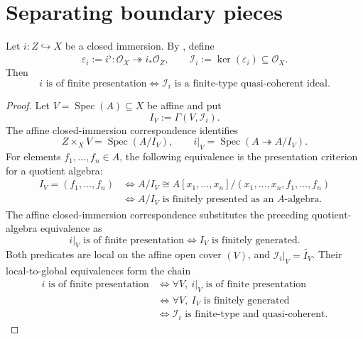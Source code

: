 \section{Separating boundary pieces}

\begin{lemma}
  \label{lemma:nagata-closed-fp-ideal-finite-type}

  Let $i\colon Z\hookrightarrow X$ be a closed immersion.  By
  , define
  \[
    \varepsilon_i:=i^\flat\colon
      \mathcal O_X\twoheadrightarrow i_*\mathcal O_Z,
    \qquad
    \mathcal I_i:=\ker(\varepsilon_i)
      \subseteq\mathcal O_X.
  \]
  Then
  \[
    i\text{ is of finite presentation}
      \Longleftrightarrow
    \mathcal I_i\text{ is a finite-type quasi-coherent ideal}.
  \]
\end{lemma}

\begin{proof}
  Let $V=\operatorname{Spec}(A)\subseteq X$ be affine and put
  \[
    I_V:=\Gamma(V,\mathcal I_i).
  \]
  The affine closed-immersion correspondence identifies
  \[
    Z\times_XV=\operatorname{Spec}(A/I_V),
    \qquad
    i|_V=\operatorname{Spec}(A\twoheadrightarrow A/I_V).
  \]
  For elements $f_1,\ldots,f_n\in A$, the following equivalence is the
  presentation criterion for a quotient algebra:
  \[
  \begin{aligned}
    I_V=(f_1,\ldots,f_n)
      &\Longleftrightarrow
        A/I_V\cong
        A[x_1,\ldots,x_n]/(x_1,\ldots,x_n,f_1,\ldots,f_n)\\
      &\Longleftrightarrow
        A/I_V\text{ is finitely presented as an }A\text{-algebra}.
  \end{aligned}
  \]
  The affine closed-immersion correspondence substitutes the preceding
  quotient-algebra equivalence as
  \[
    i|_V\text{ is of finite presentation}
      \Longleftrightarrow I_V\text{ is finitely generated}.
  \]
  Both predicates are local on the affine open cover $(V)$, and
  $\mathcal I_i|_V=\widetilde{I_V}$.  Their local-to-global equivalences form
  the chain
  \[
  \begin{aligned}
    i\text{ is of finite presentation}
      &\Longleftrightarrow
        \forall V,\ i|_V\text{ is of finite presentation}\\
      &\Longleftrightarrow
        \forall V,\ I_V\text{ is finitely generated}\\
      &\Longleftrightarrow
        \mathcal I_i\text{ is finite-type and quasi-coherent}.
  \end{aligned}
  \]
\end{proof}


